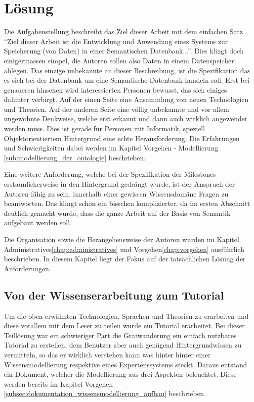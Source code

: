 \chapter{Lösung}
\label{chap:loesung}
Die Aufgabenstellung beschreibt das Ziel dieser Arbeit mit dem einfachen Satz "`Ziel dieser Arbeit ist die Entwicklung und Anwendung eines Systems zur Speicherung (von Daten) in einer Semantischen Datenbank..."'.  Dies klingt doch einigermassen simpel, die Autoren sollen also Daten in einem Datenspeicher ablegen. Das einzige unbekannte an dieser Beschreibung, ist die Spezifikation das es sich bei der Datenbank um eine Semantische Datenbank handeln soll. Erst bei genaueren hinsehen wird interessierten Personen bewusst, das sich einiges dahinter verbirgt. Auf der einen Seite eine Ansammlung von neuen Technologien und Theorien. Auf der anderen Seite eine völlig unbekannte und vor allem ungewohnte Denkweise, welche erst erkannt und dann auch wirklich angewendet werden muss. Dies ist gerade für Personen mit Informatik, speziell Objektorientiertem Hintergrund eine echte Herausforderung. Die Erfahrungen und Schwierigkeiten dabei werden im Kapitel Vorgehen - Modellierung \ref{sub:modellierung_der_ontologie} beschrieben.

Eine weitere Anforderung, welche bei der Spezifikation der Milestones erstaunlicherweise in den Hintergrund gedrängt wurde, ist der Anspruch der Autoren fähig zu sein, innerhalb einer gewissen Wissensdomäne Fragen zu beantworten. Das klingt schon ein bisschen komplizierter, da im ersten Abschnitt deutlich gemacht wurde, dass die ganze Arbeit auf der Basis von Semantik aufgebaut werden soll. 

Die Organisation sowie die Herangehensweise der Autoren wurden im Kapitel Administratives\ref{chap:administratives} und Vorgehen\ref{chap:vorgehen} ausführlich beschrieben. In diesem Kapitel liegt der Fokus auf der tatsächlichen Lösung der Anforderungen.


\section{Von der Wissenserarbeitung zum Tutorial}
\label{sec:loesung_tutorial}
Um die oben erwähnten Technologien, Sprachen und Theorien zu erarbeiten und diese vorallem mit dem Leser zu teilen wurde ein Tutorial erarbeitet. Bei dieser Teillösung war ein schwieriger Part die Gratwanderung ein einfach nutzbares Tutorial zu erstellen, dem Benutzer aber auch genügend Hintergrundwissen zu vermitteln, so das er wirklich verstehen kann was hinter hinter einer Wissensmodellierung respektive eines Expertenssystems steckt. Daraus entstand ein Dokument, welcher die Modellierung aus drei Aspekten beleuchtet. Diese werden bereits im Kapitel Vorgehen \ref{subsec:dokumentation_wissensmodellierung_aufbau} beschrieben.

